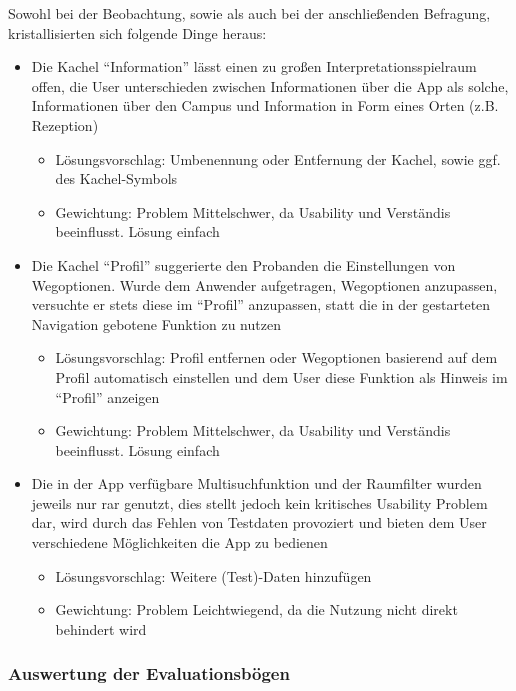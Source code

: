 Sowohl bei der Beobachtung, sowie als auch bei der anschließenden Befragung, kristallisierten sich folgende Dinge heraus:
\begin{itemize}
    \item Die Kachel “Information” lässt einen zu großen Interpretationsspielraum offen, die User unterschieden zwischen Informationen über die App als solche, Informationen über den Campus und Information in Form eines Orten (z.B. Rezeption)
    \begin{itemize}
        \item Lösungsvorschlag: Umbenennung oder Entfernung der Kachel, sowie ggf. des Kachel-Symbols
        \item Gewichtung: Problem Mittelschwer, da Usability und Verständis beeinflusst. Lösung einfach
    \end{itemize}
    \item Die Kachel “Profil” suggerierte den Probanden die Einstellungen von Wegoptionen. Wurde dem Anwender aufgetragen, Wegoptionen anzupassen, versuchte er stets diese im “Profil” anzupassen, statt die in der gestarteten Navigation gebotene Funktion zu nutzen
    \begin{itemize}
        \item Lösungsvorschlag: Profil entfernen oder Wegoptionen basierend auf dem Profil automatisch einstellen und dem User diese Funktion als Hinweis im “Profil” anzeigen
        \item Gewichtung: Problem Mittelschwer, da Usability und Verständis beeinflusst. Lösung einfach
    \end{itemize}
    \item Die in der App verfügbare Multisuchfunktion und der Raumfilter wurden jeweils nur rar genutzt, dies stellt jedoch kein kritisches Usability Problem dar, wird durch das Fehlen von Testdaten provoziert und bieten dem User verschiedene Möglichkeiten die App zu bedienen
    \begin{itemize}
        \item Lösungsvorschlag: Weitere (Test)-Daten hinzufügen
        \item Gewichtung: Problem Leichtwiegend, da die Nutzung nicht direkt behindert wird
    \end{itemize}
\end{itemize}

\subsubsection*{Auswertung der Evaluationsbögen}

